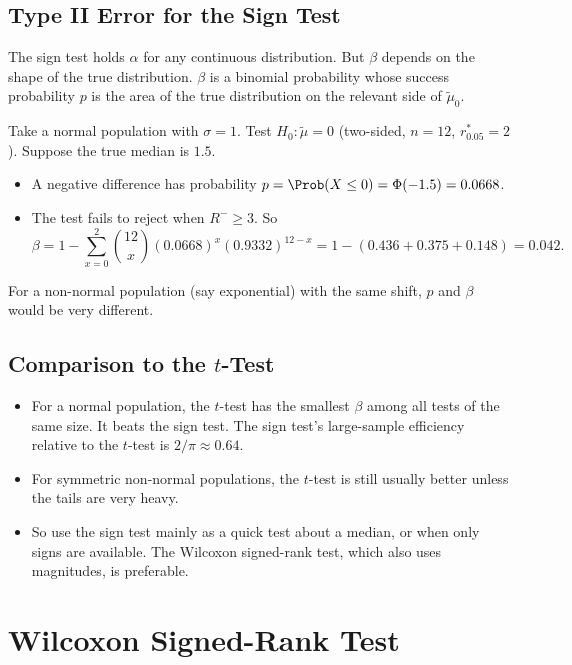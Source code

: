 \subsection{Type II Error for the Sign Test}

The sign test holds $\alpha$ for any continuous distribution. But $\beta$ depends on the shape of the true distribution. $\beta$ is a binomial probability whose success probability $p$ is the area of the true distribution on the relevant side of $\tilde\mu_0$.

\begin{example}
Take a normal population with $\sigma=1$. Test $H_0:\tilde\mu=0$ (two-sided, $n=12$, $r^*_{0.05}=2$). Suppose the true median is $1.5$.
\begin{itemize}
  \item A negative difference has probability $p=\Prob(X\le0)=\Phi(-1.5)=0.0668$.
  \item The test fails to reject when $R^-\ge3$. So
  \[ \beta=1-\sum_{x=0}^2\binom{12}x(0.0668)^x(0.9332)^{12-x}=1-(0.436+0.375+0.148)=0.042. \]
\end{itemize}
For a non-normal population (say exponential) with the same shift, $p$ and $\beta$ would be very different.
\end{example}

\subsection{Comparison to the $t$-Test}

\begin{itemize}
  \item For a normal population, the $t$-test has the smallest $\beta$ among all tests of the same size. It beats the sign test. The sign test's large-sample efficiency relative to the $t$-test is $2/\pi\approx0.64$.
  \item For symmetric non-normal populations, the $t$-test is still usually better unless the tails are very heavy.
  \item So use the sign test mainly as a quick test about a median, or when only signs are available. The Wilcoxon signed-rank test, which also uses magnitudes, is preferable.
\end{itemize}

\section{Wilcoxon Signed-Rank Test}

